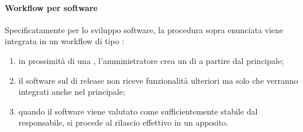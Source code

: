 		\paragraph{Workflow per software}
		Specificatamente per lo sviluppo software, la procedura sopra enunciata viene integrata in un workflow di tipo :
		\begin{enumerate}
			\item in prossimità di una , l'amministratore crea un  di  a partire dal  principale;
			\item il software sul  di release non riceve funzionalità ulteriori ma solo  che verranno integrati anche nel  principale;
			\item quando il software viene valutato come sufficientemente stabile dal responsabile, si procede al rilascio effettivo in un  apposito.
		\end{enumerate}

